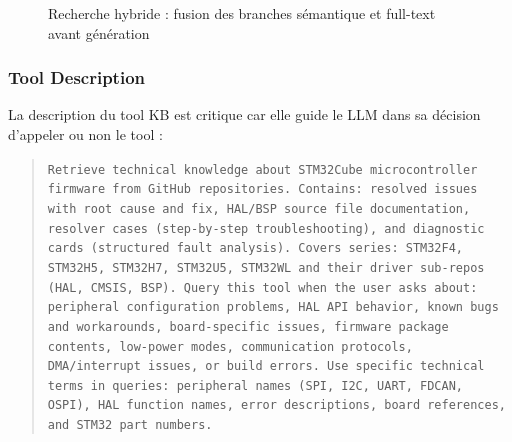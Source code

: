 \begin{figure}[H]
\centering
{}
\caption{Recherche hybride : fusion des branches sémantique et full-text avant génération}
\label{fig:hybrid_search}
\end{figure}

\subsubsection{Tool Description}

La description du tool KB est critique car elle guide le LLM dans sa décision d'appeler ou non le tool :

\begin{quote}
\small\texttt{Retrieve technical knowledge about STM32Cube microcontroller firmware from GitHub repositories. Contains: resolved issues with root cause and fix, HAL/BSP source file documentation, resolver cases (step-by-step troubleshooting), and diagnostic cards (structured fault analysis). Covers series: STM32F4, STM32H5, STM32H7, STM32U5, STM32WL and their driver sub-repos (HAL, CMSIS, BSP). Query this tool when the user asks about: peripheral configuration problems, HAL API behavior, known bugs and workarounds, board-specific issues, firmware package contents, low-power modes, communication protocols, DMA/interrupt issues, or build errors. Use specific technical terms in queries: peripheral names (SPI, I2C, UART, FDCAN, OSPI), HAL function names, error descriptions, board references, and STM32 part numbers.}
\end{quote}

